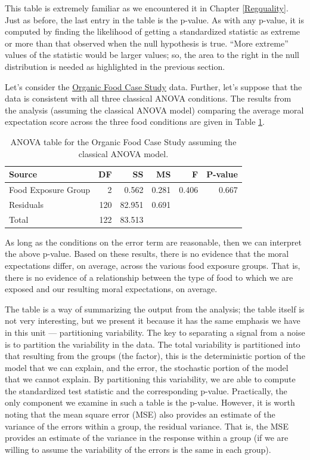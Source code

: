 \documentclass[]{book}
\theoremstyle{plain}
\theoremstyle{mydefn}
\theoremstyle{myexmpl}
\theoremstyle{remark}
\begin{document}
This table is extremely familiar as we encountered it in Chapter
\ref{Regquality}. Just as before, the last entry in the table is the
p-value. As with any p-value, it is computed by finding the likelihood
of getting a standardized statistic as extreme or more than that
observed when the null hypothesis is true. ``More extreme'' values of
the statistic would be larger values; so, the area to the right in the
null distribution is needed as highlighted in the previous section.

Let's consider the \protect\hyperlink{CaseOrganic}{Organic Food Case
Study} data. Further, let's suppose that the data is consistent with all
three classical ANOVA conditions. The results from the analysis
(assuming the classical ANOVA model) comparing the average moral
expectation score across the three food conditions are given in Table
\ref{tab:anovateststat-organic-anova-table}.

\begin{table}

\caption{\label{tab:anovateststat-organic-anova-table}ANOVA table for the Organic Food Case Study assuming the classical ANOVA model.}
\centering
\begin{tabular}[t]{l|r|r|r|r|r}
\hline
Source & DF & SS & MS & F & P-value\\
\hline
Food Exposure Group & 2 & 0.562 & 0.281 & 0.406 & 0.667\\
\hline
Residuals & 120 & 82.951 & 0.691 &  & \\
\hline
Total & 122 & 83.513 &  &  & \\
\hline
\end{tabular}
\end{table}

As long as the conditions on the error term are reasonable, then we can
interpret the above p-value. Based on these results, there is no
evidence that the moral expectations differ, on average, across the
various food exposure groups. That is, there is no evidence of a
relationship between the type of food to which we are exposed and our
resulting moral expectations, on average.

The table is a way of summarizing the output from the analysis; the
table itself is not very interesting, but we present it because it has
the same emphasis we have in this unit --- partitioning variability. The
key to separating a signal from a noise is to partition the variability
in the data. The total variability is partitioned into that resulting
from the groups (the factor), this is the deterministic portion of the
model that we can explain, and the error, the stochastic portion of the
model that we cannot explain. By partitioning this variability, we are
able to compute the standardized test statistic and the corresponding
p-value. Practically, the only component we examine in such a table is
the p-value. However, it is worth noting that the mean square error
(MSE) also provides an estimate of the variance of the errors within a
group, the residual variance. That is, the MSE provides an estimate of
the variance in the response within a group (if we are willing to assume
the variability of the errors is the same in each group).
\end{document}
